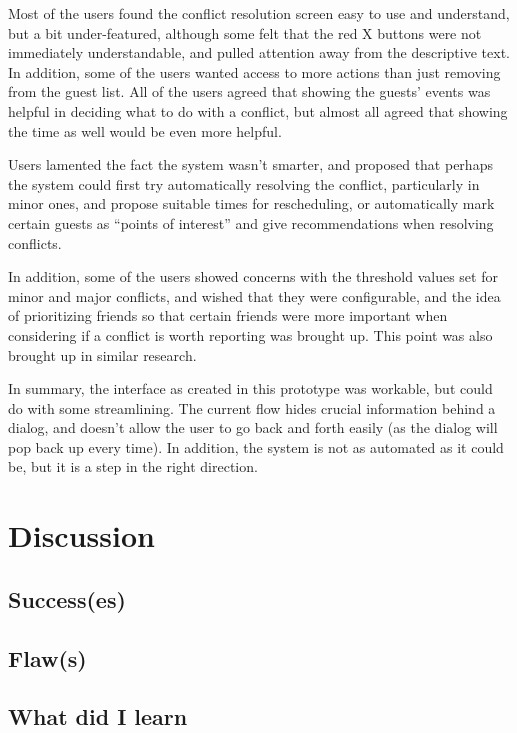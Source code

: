 \documentclass[]{report}
\begin{document}
Most of the users found the conflict resolution screen easy to use and
understand, but a bit under-featured, although some felt that the red X buttons
were not immediately understandable, and pulled attention away from the
descriptive text. In addition, some of the users wanted access to more actions
than just removing from the guest list. All of the users agreed that showing the
guests' events was helpful in deciding what to do with a conflict, but almost
all agreed that showing the time as well would be even more helpful.

Users lamented the fact the system wasn't smarter, and proposed that perhaps the
system could first try automatically resolving the conflict, particularly in
minor ones, and propose suitable times for rescheduling, or automatically mark
certain guests as ``points of interest'' and give recommendations when resolving
conflicts.

In addition, some of the users showed concerns with the threshold values set for
minor and major conflicts, and wished that they were configurable, and the idea
of prioritizing friends so that certain friends were more important when
considering if a conflict is worth reporting was brought up. This point was also
brought up in similar research\cite{benhassine07,haynes97:_autom_meetin_sched_system}.

In summary, the interface as created in this prototype was workable, but could
do with some streamlining. The current flow hides crucial information behind a
dialog, and doesn't allow the user to go back and forth easily (as the dialog
will pop back up every time). In addition, the system is not as automated as it
could be, but it is a step in the right direction.

\chapter{Discussion}

\section{Success(es)}

\section{Flaw(s)}

\section{What did I learn}
\end{document}
